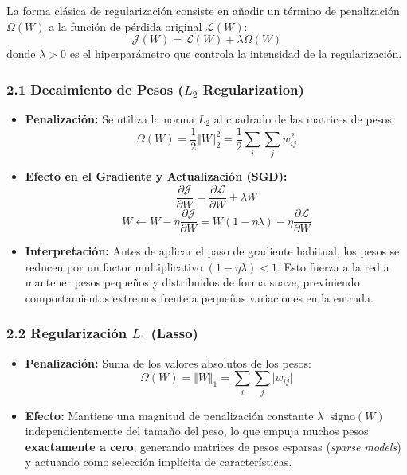 La forma clásica de regularización consiste en añadir un término de penalización $\Omega(W)$ a la función de pérdida original $\mathcal{L}(W)$:
$$\mathcal{J}(W) = \mathcal{L}(W) + \lambda \Omega(W)$$
donde $\lambda > 0$ es el hiperparámetro que controla la intensidad de la regularización.

\subsubsection{2.1 Decaimiento de Pesos ($L_2$ Regularization)}

\begin{itemize}
	\item \textbf{Penalización:} Se utiliza la norma $L_2$ al cuadrado de las matrices de pesos:
	$$\Omega(W) = \frac{1}{2} \Vert W\Vert_2^2 = \frac{1}{2} \sum_{i} \sum_{j} w_{ij}^2$$
	
	\item \textbf{Efecto en el Gradiente y Actualización (SGD):}
	$$\frac{\partial \mathcal{J}}{\partial W} = \frac{\partial \mathcal{L}}{\partial W} + \lambda W$$
	$$W \leftarrow W - \eta \frac{\partial \mathcal{J}}{\partial W} = W(1 - \eta \lambda) - \eta \frac{\partial \mathcal{L}}{\partial W}$$
	
	\item \textbf{Interpretación:} Antes de aplicar el paso de gradiente habitual, los pesos se reducen por un factor multiplicativo $(1 - \eta \lambda) < 1$. Esto fuerza a la red a mantener pesos pequeños y distribuidos de forma suave, previniendo comportamientos extremos frente a pequeñas variaciones en la entrada.
\end{itemize}

\subsubsection{2.2 Regularización $L_1$ (Lasso)}

\begin{itemize}
	\item \textbf{Penalización:} Suma de los valores absolutos de los pesos:
	$$\Omega(W) = \Vert W\Vert_1 = \sum_{i} \sum_{j} \vert w_{ij}\vert$$
	
	\item \textbf{Efecto:} Mantiene una magnitud de penalización constante $\lambda \cdot \text{signo}(W)$ independientemente del tamaño del peso, lo que empuja muchos pesos \textbf{exactamente a cero}, generando matrices de pesos esparsas (\emph{sparse models}) y actuando como selección implícita de características.
\end{itemize}

